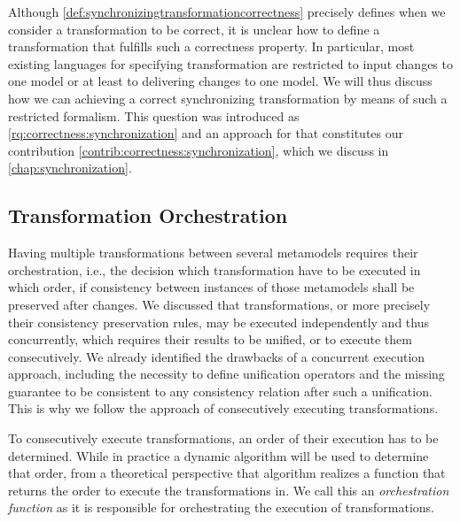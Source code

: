 Although \autoref{def:synchronizingtransformationcorrectness} precisely defines when we consider a transformation to be correct, it is unclear how to define a transformation that fulfills such a correctness property.
In particular, most existing languages for specifying transformation are restricted to input changes to one model or at least to delivering changes to one model.
We will thus discuss how we can achieving a correct synchronizing transformation by means of such a restricted formalism.
This question was introduced as \autoref{rq:correctness:synchronization} and an approach for that constitutes our contribution \autoref{contrib:correctness:synchronization}, which we discuss in \autoref{chap:synchronization}.


\subsection{Transformation Orchestration}

Having multiple transformations between several metamodels requires their orchestration, i.e., the decision which transformation have to be executed in which order, if consistency between instances of those metamodels shall be preserved after changes.
We discussed that transformations, or more precisely their consistency preservation rules, may be executed independently and thus concurrently, which requires their results to be unified, or to execute them consecutively.
We already identified the drawbacks of a concurrent execution approach, including the necessity to define unification operators and the missing guarantee to be consistent to any consistency relation after such a unification.
This is why we follow the approach of consecutively executing transformations.

To consecutively execute transformations, an order of their execution has to be determined.
While in practice a dynamic algorithm will be used to determine that order, from a theoretical perspective that algorithm realizes a function that returns the order to execute the transformations in.
We call this an \emph{orchestration function} as it is responsible for orchestrating the execution of transformations.

